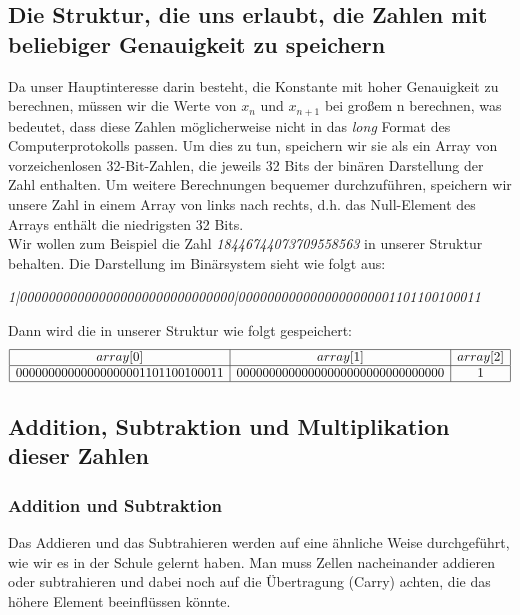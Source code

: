 \documentclass[course=erap]{aspdoc}
\begin{document}
\subsection{Die Struktur, die uns erlaubt, die Zahlen mit beliebiger Genauigkeit zu speichern}%
Da unser Hauptinteresse darin besteht, die Konstante mit hoher Genauigkeit zu berechnen, müssen wir die Werte von $x_n$ und $x_{n+1}$ bei großem n berechnen, was bedeutet, dass diese Zahlen möglicherweise nicht in das \textit{long} Format des Computerprotokolls passen. Um dies zu tun, speichern wir sie als ein Array von vorzeichenlosen 32-Bit-Zahlen, die jeweils 32 Bits der binären Darstellung der Zahl enthalten. Um weitere Berechnungen bequemer durchzuführen, speichern wir unsere Zahl in einem Array von links nach rechts, d.h. das Null-Element des Arrays enthält die niedrigsten 32 Bits.\\
Wir wollen zum Beispiel die Zahl \textit{18446744073709558563} in unserer Struktur behalten. Die Darstellung im Binärsystem sieht wie folgt aus: \\
\centerline{\textit{1|000000000000000000000000000000|0000000000000000000001101100100011}}
Dann wird die in unserer Struktur wie folgt gespeichert:
\begin{equation*}
\begin{array}{|c|c|c|}\hline
array[0] & array[1] & array[2]\\
\hline
00000000000000000001101100100011 & 00000000000000000000000000000000 & 1\\ 
\hline
\end{array}
\end{equation*}
\subsection{Addition, Subtraktion und Multiplikation dieser Zahlen}%
\subsubsection{Addition und Subtraktion}%
Das Addieren und das Subtrahieren werden auf eine ähnliche Weise durchgeführt, wie wir es in der Schule gelernt haben. Man muss Zellen nacheinander addieren oder subtrahieren und dabei noch auf die Übertragung (Carry) achten, die das höhere Element beeinflüssen könnte.
\end{document}
